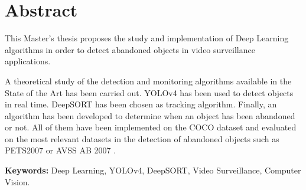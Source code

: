 
\chapter*{Abstract}
\label{cha:abstract}

\noindent
This Master's thesis proposes the study and implementation of Deep Learning algorithms in order to detect abandoned objects in video surveillance applications.

A theoretical study of the detection and monitoring algorithms available in the State of the Art has been carried out. YOLOv4 \cite{bochkovskiy2020yolov4} has been used to detect objects in real time. DeepSORT \cite{Wojke2017simple} has been chosen as tracking algorithm. Finally, an algorithm has been developed to determine when an object has been abandoned or not. All of them have been implemented on the COCO dataset \cite{lin2015microsoft} and evaluated on the most relevant datasets in the detection of abandoned objects such as PETS2007 \cite{pets2007-dataset} or AVSS AB 2007 \cite{AVSSAB2007-dataset}.

\textbf{Keywords:} Deep Learning, YOLOv4, DeepSORT, Video Surveillance, Computer Vision.